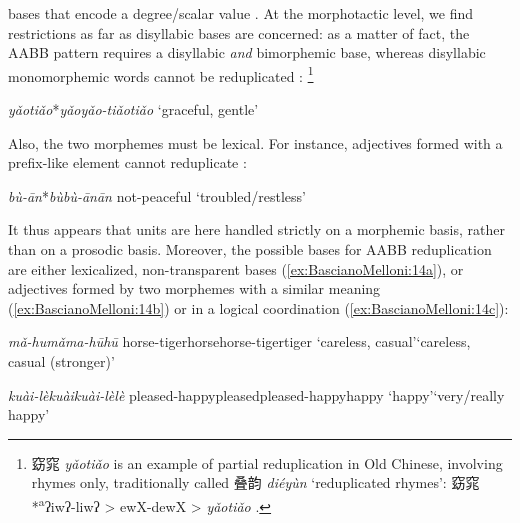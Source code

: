 \documentclass[output=paper]{langsci/langscibook}
\begin{document}
bases that encode a degree/scalar value %
\citep[see also][]{Zhu03}. %
%
At the
morphotactic level, we find restrictions as far as disyllabic bases are
concerned: as a matter of fact, the AABB pattern requires a disyllabic
\emph{and} bimorphemic base, whereas disyllabic monomorphemic words
cannot be reduplicated %
\citep[137]{Paul2010a}%
%
:%
\footnote{窈窕 \emph{yǎotiǎo} is an example of partial
  reduplication in Old Chinese, involving rhymes only, traditionally
  called 叠韵 \emph{diéyùn} `reduplicated rhymes': 窈窕 *\textsuperscript{a}ʔiwʔ-liwʔ
  \textgreater{} ewX-dewX \textgreater{} \emph{yǎotiǎo} %
\citep[  137]{Sagart1999}%
%
.}

\ea\label{ex:BascianoMelloni:12}%
        {\emph{yǎotiǎo}}{*\emph{yǎo\tld{}yǎo-tiǎo\tld{}tiǎo}}%
        {`graceful, gentle'}{}%

\z

Also, the two morphemes must be lexical. For instance, adjectives formed
with a prefix-like element cannot reduplicate %
\citep[see][]{Zhu03}%
%
:


\ea\label{ex:BascianoMelloni:13}%
        {\emph{bù-ān}}{*\emph{bù\tld{}bù-ān\tld{}ān}}%
        {not-peaceful}{}%
        {`troubled/restless'}{}%
\z

It thus appears that units are here handled strictly on a morphemic
basis, rather than on a prosodic basis. Moreover, the possible bases for
AABB reduplication are either lexicalized, non-transparent bases (\ref{ex:BascianoMelloni:14a}),
or adjectives formed by two morphemes with a similar meaning (\ref{ex:BascianoMelloni:14b}) or in
a logical coordination (\ref{ex:BascianoMelloni:14c}):

\ea\label{ex:BascianoMelloni:14}
    \ea\label{ex:BascianoMelloni:14a}%
            {\emph{mǎ-hu}}{\emph{mǎ\tld{}ma-hū\tld{}hū}}%
            {horse-tiger}{horse\tld{}horse-tiger\tld{}tiger}%
            {`careless, casual'}{`careless, casual (stronger)'}%

    \ex\label{ex:BascianoMelloni:14b}%
            {\emph{kuài-lè}}{\emph{kuài\tld{}kuài-lè\tld{}lè}}%
            {pleased-happy}{pleased\tld{}pleased-happy\tld{}happy}%
            {`happy'}{`very/really happy'}%
\end{document}
